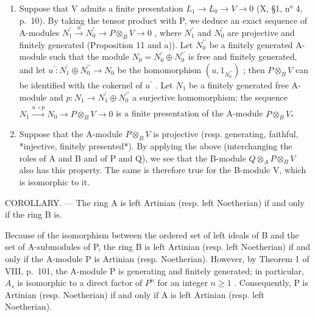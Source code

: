 \begin{enumerate}
\def\labelenumi{\alph{enumi})}
\setcounter{enumi}{4}
\item
  Suppose that V admits a finite presentation \(L_{1} \to L_{0} \to V \to 0\) (X, §1, n° 4, p.~10). By taking the tensor product with P, we deduce an exact sequence of A-modules \(N_{1}^{\prime} \xrightarrow{u} N_{0}^{\prime} \to P \otimes_{B} V \to 0\) , where \(N_{1}^{\prime}\) and \(N_{0}^{\prime}\) are projective and finitely generated (Proposition 11 and a)). Let \(N_{0}^{\prime\prime}\) be a finitely generated A-module such that the module \(N_{0} = N_{0}^{\prime} \oplus N_{0}^{\prime\prime}\) is free and finitely generated, and let \(u^{\prime}: N_{1}^{\prime} \oplus N_{0}^{\prime\prime} \to N_{0}\) be the homomorphism \((u, 1_{N_{0}^{\prime\prime}})\) ; then \(P \otimes_{B} V\) can be identified with the cokernel of \(u^{\prime}\) . Let \(N_{1}\) be a finitely generated free A-module and \(p: N_{1} \to N_{1}^{\prime} \oplus N_{0}^{\prime\prime}\) a surjective homomorphism; the sequence \(N_{1} \xrightarrow{u^{\prime} \circ p} N_{0} \to P \otimes_{B} V \to 0\) is a finite presentation of the A-module \(P \otimes_{B} V_*\)
\item
  Suppose that the A-module \(P \otimes_{B} V\) is projective (resp. generating, faithful, *injective, finitely presented*). By applying the above (interchanging the roles of A and B and of P and Q), we see that the B-module \(Q \otimes_{A} P \otimes_{B} V\) also has this property. The same is therefore true for the B-module V, which is isomorphic to it.
\end{enumerate}

COROLLARY. --- The ring A is left Artinian (resp. left Noetherian) if and only if the ring B is.

Because of the isomorphism between the ordered set of left ideals of B and the set of A-submodules of P, the ring B is left Artinian (resp. left Noetherian) if and only if the A-module P is Artinian (resp. Noetherian). However, by Theorem 1 of VIII, p.~101, the A-module P is generating and finitely generated; in particular, \(A_{s}\) is isomorphic to a direct factor of \(P^{n}\) for an integer \(n \geqslant 1\) . Consequently, P is Artinian (resp. Noetherian) if and only if A is left Artinian (resp. left Noetherian).

